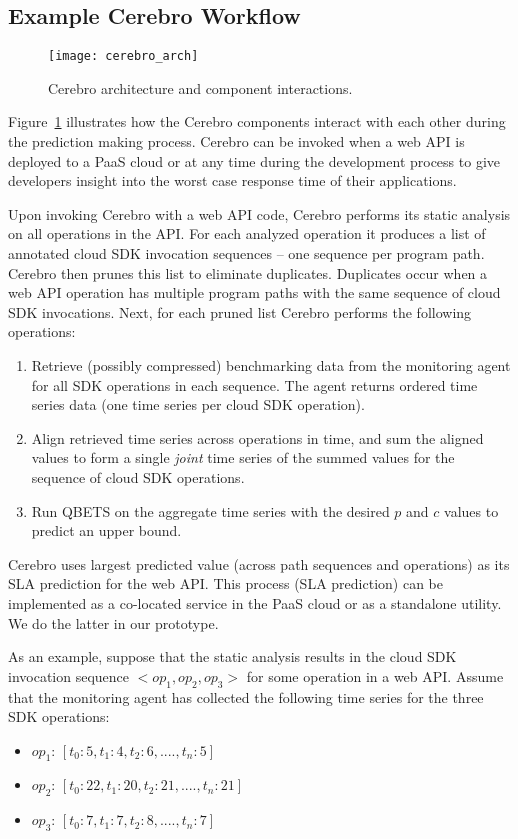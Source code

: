 \subsection{Example Cerebro Workflow}

\begin{figure}
\centering
\texttt{[image: cerebro\_arch]}
\caption{Cerebro architecture and component interactions.}
\label{fig:cerebro_arch}
\end{figure}

Figure~\ref{fig:cerebro_arch} illustrates how the Cerebro components interact with
each other during the prediction making process.  Cerebro can be
invoked when a web API is deployed to a PaaS cloud or at any time during the development
process to give developers insight into the worst case response time of their
applications.

Upon invoking Cerebro with a web API code, Cerebro
performs its static analysis on all operations in the API. For each
analyzed operation it produces a list of annotated cloud SDK invocation sequences --
one sequence per program path. Cerebro then prunes this list to eliminate duplicates.
Duplicates occur when a web API operation has
multiple program paths with the same sequence of cloud SDK invocations.
Next, for each pruned list Cerebro performs the following operations:
\begin{enumerate}
\item Retrieve (possibly compressed) benchmarking data from the monitoring agent 
for all SDK operations in each sequence. The agent returns
ordered time series data (one time series per cloud SDK operation).
\item Align retrieved time series across operations in time, and sum the aligned
values
to form a single \textit{joint} time series of the summed values for the 
sequence of cloud SDK operations.
\item Run QBETS on the aggregate time series with the 
desired $p$ and $c$ values to predict an upper bound. 
\end{enumerate}
Cerebro uses largest predicted value (across path sequences and operations) 
as its SLA prediction for the web API.
This process (SLA prediction) can be implemented
as a co-located service in the PaaS cloud or as a standalone utility.  We do 
the latter in our prototype.

As an example, suppose that the static analysis results in the
cloud SDK invocation sequence $<op_{1},op_{2},op_{3}>$ for
some operation in a web API. 
Assume that the monitoring agent has collected the following
time series for the three SDK operations:
\begin{itemize}
\item $op_{1}$: $[t_{0}: 5, t_{1}: 4, t_{2}: 6, ...., t_{n}: 5]$
\item $op_{2}$: $[t_{0}: 22, t_{1}: 20, t_{2}: 21, ...., t_{n}: 21]$
\item $op_{3}$: $[t_{0}: 7, t_{1}: 7, t_{2}: 8, ...., t_{n}: 7]$
\end{itemize}

